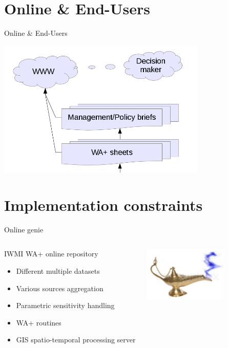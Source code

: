 \documentclass[xcolor=dvipsnames,beamer]{beamer} %
\begin{document}
\section{Online \& End-Users}
\begin{frame}[fragile]{Online \& End-Users}

\begin{center}
 \includegraphics[width=10cm]{1}
\end{center}

\end{frame}

\section{Implementation constraints}
\begin{frame}[fragile]{Online genie}

\begin{columns}[l]
\begin{block}{IWMI WA+ online repository}
\begin{itemize}
 \item Different multiple datasets
 \item Various sources aggregation
 \item Parametric sensitivity handling
 \item WA+ routines
 \item GIS spatio-temporal processing server
\end{itemize}
\end{block}

\begin{center}
 \includegraphics[width=4cm]{lamp}
\end{center}
\end{columns}

\end{frame}
\end{document}
